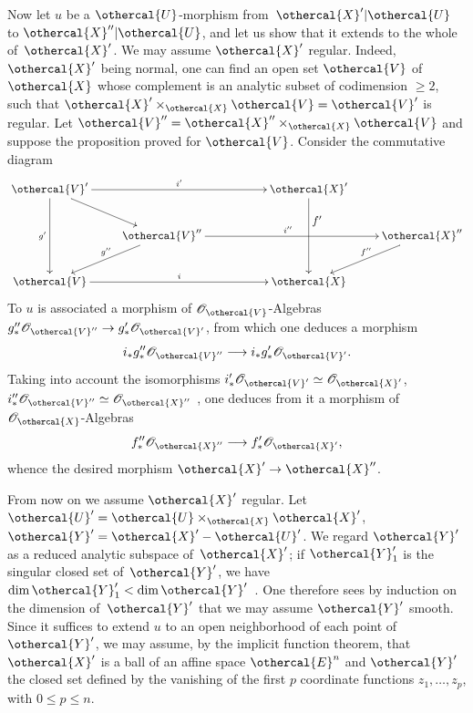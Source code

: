 Now let $u$ be a $\othercal{U}$-morphism from~$\othercal{X}'|\othercal{U}$
to $\othercal{X}''|\othercal{U}$, and let us show that it extends to
the whole of~$\othercal{X}'$. We may assume $\othercal{X}'$ regular.
Indeed, $\othercal{X}'$ being normal, one can find an open set
$\othercal{V}$ of~$\othercal{X}$ whose complement is an analytic
subset of codimension $\geq 2$, such that
$\othercal{X}'\times_{\othercal{X}}\othercal{V}=\othercal{V}'$ is regular.
Let $\othercal{V}''=\othercal{X}''\times_{\othercal{X}}\othercal{V}$ and suppose the
proposition proved for $\othercal{V}$. Consider the commutative
diagram
$$
\xymatrix{ \othercal{V}' \ar[dd]_{g'}\ar[rd]\ar[rrr]^{i'} && &\othercal{X}'
\ar[dd]^{\hbox{\raise10mm\hbox{$f'$}}} \cr &\othercal{V}'' \ar[ld]_{g''\mkern-10mu}\ar[rrr]^-{i''~~} & &
&\othercal{X}'' \ar[ld]_{f''\mkern-12mu} \cr \othercal{V} \ar[rrr]^{i} && &\othercal{X} \cr
}
$$
To $u$ is associated a morphism of
$\cal{O}_{\othercal{V}}$-Algebras $g''_*\cal{O}_{\othercal{V}''}\to
g'_*\cal{O}_{\othercal{V}'}$, from which one deduces a morphism
$$
i_*g''_*\cal{O}_{\othercal{V}''} \to
i_*g'_*\cal{O}_{\othercal{V}'}\quoi.
$$
Taking into account the isomorphisms
$i'_*\cal{O}_{\othercal{V}'}\simeq\cal{O}_{\othercal{X}'}$,
$i''_*\cal{O}_{\othercal{V}''}\simeq\cal{O}_{\othercal{X}''}$
\cite[~prop]{XII.11}, one deduces from it a morphism of
$\cal{O}_{\othercal{X}}$-Algebras
$$
f''_*\cal{O}_{\othercal{X}''} \to
f'_*\cal{O}_{\othercal{X}'}\quoi,
$$
whence the desired morphism $\othercal{X}'\to\othercal{X}''$.

From
now on we assume $\othercal{X}'$ regular. Let
$\othercal{U}'=\othercal{U}\times_{\othercal{X}}\othercal{X}'$,
$\othercal{Y}'=\othercal{X}'-\othercal{U}'$. We regard $\othercal{Y}'$ as a
reduced analytic subspace of~$\othercal{X}'$; if $\othercal{Y}'_{1}$
is the singular closed set of~$\othercal{Y}'$, we have $\dim \othercal{Y}'_{1} <
\dim \othercal{Y}'$~\cite[~D\ptbl Th]{XII.4}. One therefore sees by induction
on the dimension of~$\othercal{Y}'$ that we may assume $\othercal{Y}'$
smooth. Since it suffices to extend $u$ to an open neighborhood of
each point of~$\othercal{Y}'$, we may assume, by the implicit function
theorem, that $\othercal{X}'$ is a ball of an affine
space $\othercal{E}^{n}$ and $\othercal{Y}'$ the closed set defined by
the vanishing of the first $p$ coordinate functions
$z_{1},\dots,z_{p}$, with $0\leq p\leq n$.

